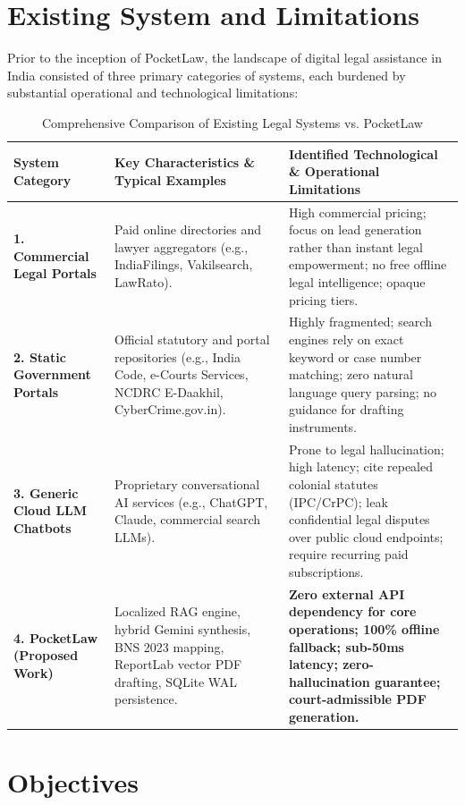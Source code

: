 \section{Existing System and Limitations}
\label{sec:existing_system}

Prior to the inception of PocketLaw, the landscape of digital legal assistance in India consisted of three primary categories of systems, each burdened by substantial operational and technological limitations:

\begin{table}[H]
\caption{Comprehensive Comparison of Existing Legal Systems vs. PocketLaw}
\label{tab:existing_systems_comparison}
\centering
\small
\begin{tabularx}{\textwidth}{p{3.2cm}Xp{4.2cm}}
\toprule
\textbf{System Category} & \textbf{Key Characteristics \& Typical Examples} & \textbf{Identified Technological \& Operational Limitations} \\
\midrule
\textbf{1. Commercial Legal Portals} & Paid online directories and lawyer aggregators (e.g., IndiaFilings, Vakilsearch, LawRato). & High commercial pricing; focus on lead generation rather than instant legal empowerment; no free offline legal intelligence; opaque pricing tiers. \\
\midrule
\textbf{2. Static Government Portals} & Official statutory and portal repositories (e.g., India Code, e-Courts Services, NCDRC E-Daakhil, CyberCrime.gov.in). & Highly fragmented; search engines rely on exact keyword or case number matching; zero natural language query parsing; no guidance for drafting instruments. \\
\midrule
\textbf{3. Generic Cloud LLM Chatbots} & Proprietary conversational AI services (e.g., ChatGPT, Claude, commercial search LLMs). & Prone to legal hallucination; high latency; cite repealed colonial statutes (IPC/CrPC); leak confidential legal disputes over public cloud endpoints; require recurring paid subscriptions. \\
\midrule
\textbf{4. PocketLaw (Proposed Work)} & Localized RAG engine, hybrid Gemini synthesis, BNS 2023 mapping, ReportLab vector PDF drafting, SQLite WAL persistence. & \textbf{Zero external API dependency for core operations; 100\% offline fallback; sub-50ms latency; zero-hallucination guarantee; court-admissible PDF generation.} \\
\bottomrule
\end{tabularx}
\end{table}

\section{Objectives}
\label{sec:objectives}

